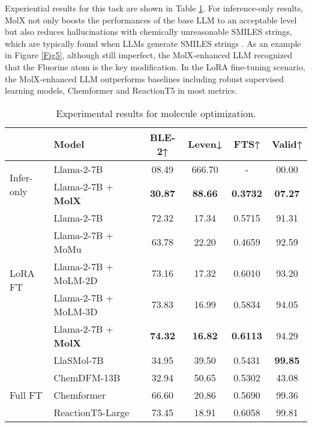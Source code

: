 \noindent
Experiential results for this task are shown in Table \ref{molecule-optimization}. For inference-only results, MolX not only boosts the performances of the base LLM to an acceptable level but also reduces hallucinations with chemically unreasonable SMILES strings, which are typically found when LLMs generate SMILES strings \cite{guo2023can}. As an example in Figure \ref{Fig5}, although still imperfect, the MolX-enhanced LLM recognized that the Fluorine atom is the key modification. In the LoRA fine-tuning scenario, the MolX-enhanced LLM outperforms baselines including robust supervised learning models, Chemformer \cite{irwin2022chemformer} and ReactionT5 \cite{sagawa2023reactiont5} in most metrics. 

\begin{table}[!ht]
\centering
\caption{Experimental results for molecule optimization.}
\label{molecule-optimization}
\setlength{\tabcolsep}{2.99pt}
\renewcommand{\arraystretch}{0.90}
\scriptsize

\begin{tabular*}{\linewidth}{@{\extracolsep{\fill}}ll|cccc}
\toprule

\multirow[t]{2}{*}{} &\multirow[t]{2}{*}{Model} &BLE-2↑ &Leven↓ &FTS↑ &Valid↑ \\
\midrule
\multirow[t]{2}{*}{Infer-only}
&Llama-2-7B                 &08.49 &666.70 &-      &00.00 \\
&Llama-2-7B + \textbf{MolX} &\textbf{30.87} &\phantom{6}\textbf{88.66} &\textbf{0.3732} &\textbf{07.27} \\
\midrule
\multirow[t]{5}{*}{LoRA FT}
&Llama-2-7B                 &72.32 &\phantom{6}17.34 &0.5715 &91.31 \\
&Llama-2-7B + MoMu          &63.78 &\phantom{6}22.20 &0.4659 &92.59 \\
&Llama-2-7B + MoLM-2D       &73.16 &\phantom{6}17.32 &0.6010 &93.20 \\
&Llama-2-7B + MoLM-3D       &73.83 &\phantom{6}16.99 &0.5834 &94.05 \\
&Llama-2-7B + \textbf{MolX} &\textbf{74.32} &\phantom{6}\textbf{16.82} &\textbf{0.6113} &94.29 \\
\rowcolor{customgray}
&LlaSMol-7B                 &34.95 &\phantom{6}39.50 &0.5431 &\textbf{99.85} \\
\rowcolor{customgray}
&ChemDFM-13B                &32.94 &\phantom{6}50.65 &0.5302 &43.08 \\
\midrule
Full FT
&Chemformer                 &66.60 &\phantom{6}20.86 &0.5690 &99.36 \\
&ReactionT5-Large           &73.45 &\phantom{6}18.91 &0.6058 &99.81 \\

\bottomrule
\end{tabular*}
\end{table}

